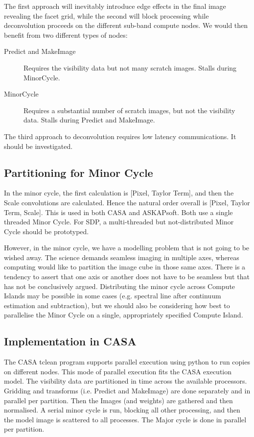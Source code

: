 \documentclass[11pt,a4paper,variablewidth]{article}
\begin{document}
The first approach will inevitably introduce edge effects in the final image revealing the facet grid, while the second will block processing while deconvolution proceeds on the different sub-band compute nodes. We would then benefit from two different types of nodes:
\begin{description}
\item[Predict and MakeImage] Requires the visibility data but not many scratch images. Stalls during MinorCycle.
\item[MinorCycle] Requires a substantial number of scratch images, but not the visibility data. Stalls during Predict and MakeImage.	
\end{description}

The third approach to deconvolution requires low latency communications. It should be investigated.

\subsection{Partitioning for Minor Cycle}

In the minor cycle, the first calculation is [Pixel, Taylor Term], and then the Scale convolutions are calculated. Hence the natural order overall is [Pixel, Taylor Term, Scale]. This is used in both CASA and ASKAPsoft. Both use a single threaded Minor Cycle. For SDP, a multi-threaded but not-distributed Minor Cycle should be prototyped.

However, in the minor cycle, we have a modelling problem that is not going to be wished away. The science demands seamless imaging in multiple axes, whereas computing would like to partition the image cube in those same axes. There is a tendency to assert that one axis or another does not have to be seamless but that has not be conclusively argued. Distributing the minor cycle across Compute Islands may be possible in some cases (e.g. spectral line after continuum estimation and subtraction), but we should also be considering how best to parallelise the Minor Cycle on a single, appropriately specified Compute Island.

\subsection{Implementation in CASA}

The CASA tclean program supports parallel execution using python to run copies on different nodes. This mode of parallel execution fits the CASA execution model. The visibility data are partitioned in time across the available processors. Gridding and transforms (i.e. Predict and MakeImage) are done separately and in parallel per partition. Then the Images (and weights) are gathered and then normalised. A serial minor cycle is run, blocking all other processing, and then the model image is scattered to all processes. The Major cycle is done in parallel per partition.
\end{document}
